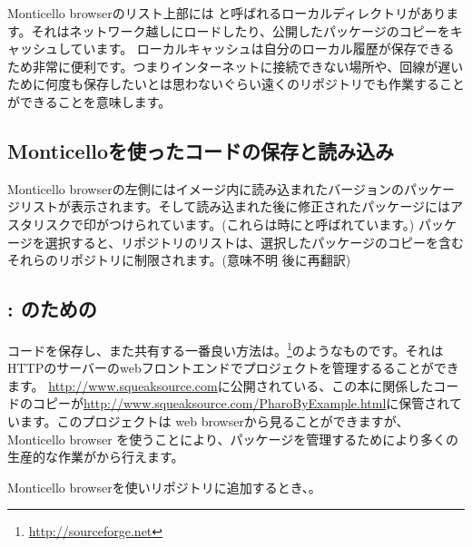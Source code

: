 \documentclass[a4paper,10pt,twoside]{book}
\begin{document}
Monticello browserのリスト上部には と呼ばれるローカルディレクトリがあります。それはネットワーク越しにロードしたり、公開したパッケージのコピーをキャッシュしています。
ローカルキャッシュは自分のローカル履歴が保存できるため非常に便利です。つまりインターネットに接続できない場所や、回線が遅いために何度も保存したいとは思わないぐらい遠くのリポジトリでも作業することができることを意味します。


\subsection{Monticelloを使ったコードの保存と読み込み}
Monticello browserの左側にはイメージ内に読み込まれたバージョンのパッケージリストが表示されます。そして読み込まれた後に修正されたパッケージにはアスタリスクで印がつけられています。(これらは時にと呼ばれています。) パッケージを選択すると、リポジトリのリストは、選択したパッケージのコピーを含むそれらのリポジトリに制限されます。(意味不明 後に再翻訳)



\subsection{\ind{\sqsrc}: \pharo{}のための} 
コードを保存し、また共有する一番良い方法は。\footnote{\url{http://sourceforge.net}}のようなものです。それはHTTPのサーバーのwebフロントエンドでプロジェクトを管理するることができます。
\url{http://www.squeaksource.com}に公開されている、この本に関係したコードのコピーが\url{http://www.squeaksource.com/PharoByExample.html}に保管されています。このプロジェクトは web browserから見ることができますが、Monticello browser を使うことにより、パッケージを管理するためにより多くの生産的な作業が\pharo{}から行えます。

Monticello browserを使いリポジトリに追加するとき、。
\end{document}

